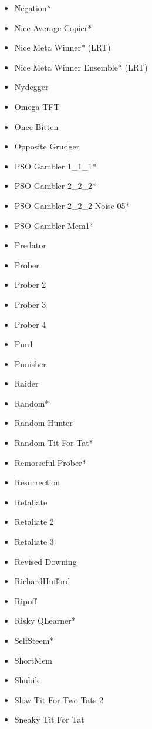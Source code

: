 \begin{appendices}
\begin{multicols}{4}
\begin{itemize}
            \item Negation*
            \item Nice Average Copier*
            \item Nice Meta Winner* (LRT)
            \item Nice Meta Winner Ensemble* (LRT)
            \item Nydegger
            \item Omega TFT
            \item Once Bitten
            \item Opposite Grudger
            \item PSO Gambler 1\_1\_1*
            \item PSO Gambler 2\_2\_2*
            \item PSO Gambler 2\_2\_2 Noise 05*
            \item PSO Gambler Mem1*
            \item Predator
            \item Prober
            \item Prober 2
            \item Prober 3
            \item Prober 4
            \item Pun1
            \item Punisher
            \item Raider
            \item Random*
            \item Random Hunter
            \item Random Tit For Tat*
            \item Remorseful Prober*
            \item Resurrection
            \item Retaliate
            \item Retaliate 2
            \item Retaliate 3
            \item Revised Downing
            \item RichardHufford
            \item Ripoff
            \item Risky QLearner*
            \item SelfSteem*
            \item ShortMem
            \item Shubik
            \item Slow Tit For Two Tats 2
            \item Sneaky Tit For Tat

\end{itemize}
\end{multicols}
\end{appendices}
